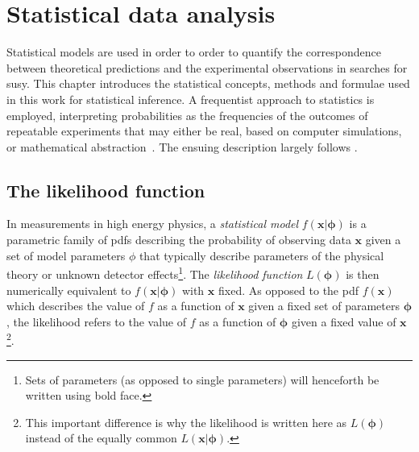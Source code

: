 

\chapter{Statistical data analysis}\label{ch:statistics}

\ifpdf
    \graphicspath{{chapter-statistics/Figs/Raster/}{chapter-statistics/Figs/PDF/}{chapter-statistics/Figs/}}
\else
    \graphicspath{{chapter-statistics/Figs/Vector/}{chapter-statistics/Figs/}}
\fi


Statistical models are used in order to order to quantify the correspondence between theoretical predictions and the experimental observations in searches for \gls{susy}. This chapter introduces the statistical concepts, methods and formulae used in this work for statistical inference. A frequentist approach to statistics is employed, interpreting probabilities as the frequencies of the outcomes of repeatable experiments that may either be real, based on computer simulations, or mathematical abstraction~\cite{pdg2020,Cranmer:2015nia}. The ensuing description largely follows \cite{Cranmer:2015nia, Cowan:2010js}.

\section{The likelihood function}\label{sec:likelihood_function}
 
In measurements in high energy physics, a \textit{statistical model} $f(\boldsymbol{x}\vert\boldsymbol{\phi})$ is a parametric family of \glspl{pdf} describing the probability of observing data $\boldsymbol{x}$ given a set of model parameters $\phi$ that typically describe parameters of the physical theory or unknown detector effects\footnote{Sets of parameters (as opposed to single parameters) will henceforth be written using bold face.}. The \textit{likelihood function} $L(\boldsymbol{\phi})$ is then numerically equivalent to $f(\boldsymbol{x}\vert\boldsymbol{\phi})$ with $\boldsymbol{x}$ fixed. As opposed to the \gls{pdf} $f(\boldsymbol{x})$ which describes the value of $f$ as a function of $\boldsymbol{x}$ given a fixed set of parameters $\boldsymbol{\phi}$, the likelihood refers to the value of $f$ as a function of $\boldsymbol{\phi}$ given a fixed value of $\boldsymbol{x}$\footnote{This important difference is why the likelihood is written here as $L(\boldsymbol{\phi})$ instead of the equally common $L(\boldsymbol{x}\vert\boldsymbol{\phi})$.}.

